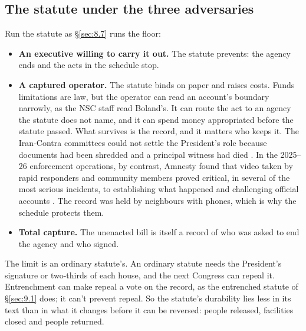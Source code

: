 \subsection{The statute under the three adversaries}
\label{sec:8.4.4}
Run the statute as \S\ref{sec:8.7} runs the floor:

\begin{itemize}
\item \textbf{An executive willing to carry it out.} The statute prevents: the agency ends and the acts in the schedule stop.
\item \textbf{A captured operator.} The statute binds on paper and raises costs. Funds limitations are law, but the operator can read an account's boundary narrowly, as the NSC staff read Boland's. It can route the act to an agency the statute does not name, and it can spend money appropriated before the statute passed. What survives is the record, and it matters who keeps it. The Iran-Contra committees could not settle the President's role because documents had been shredded and a principal witness had died \autocite{irancontra1987}. In the 2025–26 enforcement operations, by contrast, Amnesty found that video taken by rapid responders and community members proved critical, in several of the most serious incidents, to establishing what happened and challenging official accounts \autocite{Amnesty2026Whistles}. The record was held by neighbours with phones, which is why the schedule protects them.
\item \textbf{Total capture.} The unenacted bill is itself a record of who was asked to end the agency and who signed.
\end{itemize}

The limit is an ordinary statute's. An ordinary statute needs the President's signature or two-thirds of each house, and the next Congress can repeal it. Entrenchment can make repeal a vote on the record, as the entrenched statute of \S\ref{sec:9.1} does; it can't prevent repeal. So the statute's durability lies less in its text than in what it changes before it can be reversed: people released, facilities closed and people returned.
